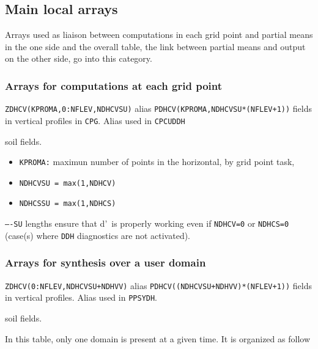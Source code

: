 \subsection{Main local arrays}
Arrays used as liaison between computations in each grid point and partial means in the one side and the overall table, the link between partial means and output on the other side, go into this category.
\subsubsection{Arrays for computations at each grid point}
{\tt ZDHCV(KPROMA,0:NFLEV,NDHCVSU)} alias {\tt PDHCV(KPROMA,NDHCVSU*(NFLEV+1))} fields in vertical profiles in {\tt CPG}. Alias used in {\tt CPCUDDH}

 soil fields.

\begin{itemize}
\item {\tt KPROMA:} maximun number of points in the horizontal, by grid point task,
\item {\tt NDHCVSU = max(1,NDHCV)}
\item {\tt NDHCSSU = max(1,NDHCS)}
\end{itemize}

{\tt ----SU} lengths ensure that d'\ARP\ is properly working even if {\tt NDHCV=0} or {\tt NDHCS=0} (case(s) where {\tt DDH} diagnostics are not activated).

\subsubsection{Arrays for synthesis over a user domain}
{\tt ZDHCV(0:NFLEV,NDHCVSU+NDHVV)} alias {\tt PDHCV((NDHCVSU+NDHVV)*(NFLEV+1))} fields in vertical profiles. Alias used in {\tt PPSYDH}.

 soil fields.

In this table, only one domain is present at a given time. It is organized as follow


